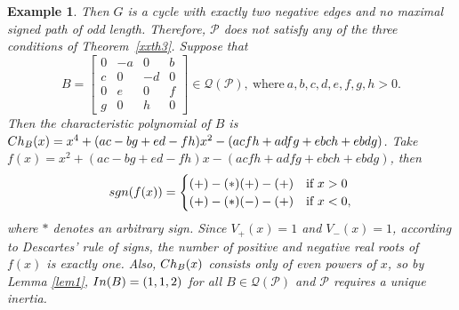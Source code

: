 \documentclass[10pt,a4paper]{amsart}
\newtheorem{eg}{Example}[section]
\numberwithin{equation}{section}
\def\sgn{{\rm sgn}}
\def\In{{\rm In}}
\def\Ch{{\rm Ch}}
\begin{document}
\begin{eg}
	Then $G$ is a cycle with exactly two negative edges and no maximal signed path of odd length. Therefore, $\mathcal{P}$ does not satisfy any of the three conditions
	of Theorem~\ref{xxth3}. Suppose that
	$$B=\begin{bmatrix}
		0&-a&0&b\\c&0&-d&0\\0&e&0&f\\g&0&h&0
	\end{bmatrix}\in \mathcal{Q}(\mathcal{P}),~\text{where}~a,b,c,d,e,f,g,h>0.$$
	Then the characteristic polynomial of $B$ is $\Ch_B(x)=x^4+(ac-bg+ed-fh)x^2-(acfh+adfg+ebch+ebdg)$. Take $f(x)=x^2+(ac-bg+ed-fh)x-(acfh+adfg+ebch+ebdg)$, then
	$$ 
	\sgn(f(x)) =  \begin{cases} 
		(+)-(*)(+)-(+) & \text{if} ~ x> 0 \\
		(+)-(*)(-)-(+) & \text{if} ~x<0,
	\end{cases} 
	$$ where $*$ denotes an arbitrary sign. Since $V_+(x)=1$ and $V_-(x)=1$, according to Descartes’ rule of signs, the number of positive and negative real roots of $f(x)$ is exactly one. Also, $\Ch_{B}(x)$ consists only of even powers of $x$, so by Lemma \ref{lem1}, $\In(B)=(1,1,2)$ for all $B\in \mathcal{Q}(\mathcal{P})$ and $\mathcal{P}$ requires a unique inertia.
\end{eg}
\end{document}
